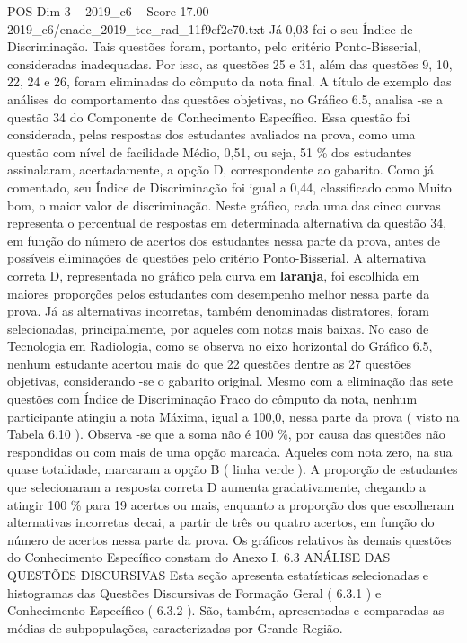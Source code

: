 \begin{textsample}{POS Dim 3 – 2019\_c6 – Score 17.00 – 2019\_c6/enade\_2019\_tec\_rad\_11f9cf2c70.txt}
Já 0,03 foi o seu Índice de Discriminação.
Tais questões foram, portanto, pelo critério Ponto-Bisserial, consideradas inadequadas.
Por isso, as questões 25 e 31, além das questões 9, 10, 22, 24 e 26, foram eliminadas do cômputo da nota final.
A título de exemplo das análises do comportamento das questões objetivas, no Gráfico 6.5, analisa -se a questão 34 do Componente de Conhecimento Específico.
Essa questão foi considerada, pelas respostas dos estudantes avaliados na prova, como uma questão com nível de facilidade Médio, 0,51, ou seja, 51 \% dos estudantes assinalaram, acertadamente, a opção D, correspondente ao gabarito.
Como já comentado, seu Índice de Discriminação foi igual a 0,44, classificado como Muito bom, o maior valor de discriminação.
Neste gráfico, cada uma das cinco curvas representa o percentual de respostas em determinada alternativa da questão 34, em função do número de acertos dos estudantes nessa parte da prova, antes de possíveis eliminações de questões pelo critério Ponto-Bisserial.
A alternativa correta D, representada no gráfico pela curva em \textbf{laranja}, foi escolhida em maiores proporções pelos estudantes com desempenho melhor nessa parte da prova.
Já as alternativas incorretas, também denominadas distratores, foram selecionadas, principalmente, por aqueles com notas mais baixas.
No caso de Tecnologia em Radiologia, como se observa no eixo horizontal do Gráfico 6.5, nenhum estudante acertou mais do que 22 questões dentre as 27 questões objetivas, considerando -se o gabarito original.
Mesmo com a eliminação das sete questões com Índice de Discriminação Fraco do cômputo da nota, nenhum participante atingiu a nota Máxima, igual a 100,0, nessa parte da prova ( visto na Tabela 6.10 ).
Observa -se que a soma não é 100 \%, por causa das questões não respondidas ou com mais de uma opção marcada.
Aqueles com nota zero, na sua quase totalidade, marcaram a opção B ( linha verde ).
A proporção de estudantes que selecionaram a resposta correta D aumenta gradativamente, chegando a atingir 100 \% para 19 acertos ou mais, enquanto a proporção dos que escolheram alternativas incorretas decai, a partir de três ou quatro acertos, em função do número de acertos nessa parte da prova.
Os gráficos relativos às demais questões do Conhecimento Específico constam do Anexo I. 6.3 ANÁLISE DAS QUESTÕES DISCURSIVAS Esta seção apresenta estatísticas selecionadas e histogramas das Questões Discursivas de Formação Geral ( 6.3.1 ) e Conhecimento Específico ( 6.3.2 ).
São, também, apresentadas e comparadas as médias de subpopulações, caracterizadas por Grande Região.

\end{textsample}

